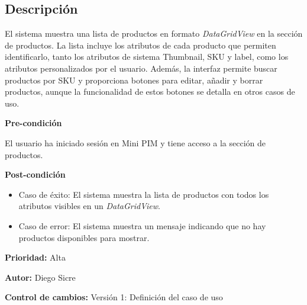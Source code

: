 {}

\subsection*{Descripción}
El sistema muestra una lista de productos en formato \textit{DataGridView} en la sección de productos. La lista incluye los atributos de cada producto que permiten identificarlo, tanto los atributos de sistema Thumbnail, SKU y label, como los atributos personalizados por el usuario. Además, la interfaz permite buscar productos por SKU y proporciona botones para editar, añadir y borrar productos, aunque la funcionalidad de estos botones se detalla en otros casos de uso.

\vspace{0.15cm}

\textbf{Pre-condición}\par
El usuario ha iniciado sesión en Mini PIM y tiene acceso a la sección de productos.\par
\vspace{0.15cm}

\textbf{Post-condición}
\begin{itemize}
    \item Caso de éxito: El sistema muestra la lista de productos con todos los atributos visibles en un \textit{DataGridView}.
    \item Caso de error: El sistema muestra un mensaje indicando que no hay productos disponibles para mostrar.
\end{itemize}

\textbf{Prioridad: }
Alta
\vspace{0.15cm}

\textbf{Autor: }
Diego Sicre\par
\vspace{0.15cm}

\textbf{Control de cambios: } Versión 1: Definición del caso de uso

